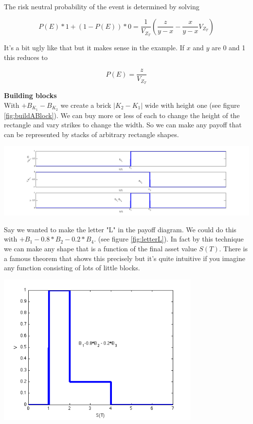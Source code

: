 The risk neutral probability of the event is determined by solving

\[P(E)*1 + (1-P(E))*0 =  \frac{1}{V_{Z_T}} \left(\frac{z}{y-x}  -\frac{x}{y-x}V_{Z_T} \right) \]

It's a bit ugly like that but it makes sense in the example. If $x$ and $y$ are 0 and 1 this reduces to

\[P(E) = \frac{z}{V_{Z_T}}\]

\textbf{Building blocks}\\
With $+B_{K_1}-B_{K_2}$ we create a brick $|K_2-K_1|$ wide with height one (see figure \ref{fig:buildABlock}). We can buy more or less of each to change the height of the rectangle and vary strikes to change the width. So we can make any payoff that can be represented by stacks of arbitrary rectangle shapes. 

 \begin{center}
\includegraphics[width=6in]{pics/buildABlock}%
\label{fig:buildABlock}%
\end{center}


Say we wanted to make the letter "L" in the payoff diagram. We could do this with $+B_{1} - 0.8*B_{2}  -0.2*B_{4}$. (see figure \ref{fig:letterL}). In fact by this technique we can make any shape that is a function of the final asset value $S(T)$. There is a famous theorem that shows this precisely but it's quite intuitive if you imagine any function consisting of lots of little blocks.

 \begin{center}
\includegraphics[width=4in]{pics/letterL}%
\label{fig:letterL}%
\end{center}

